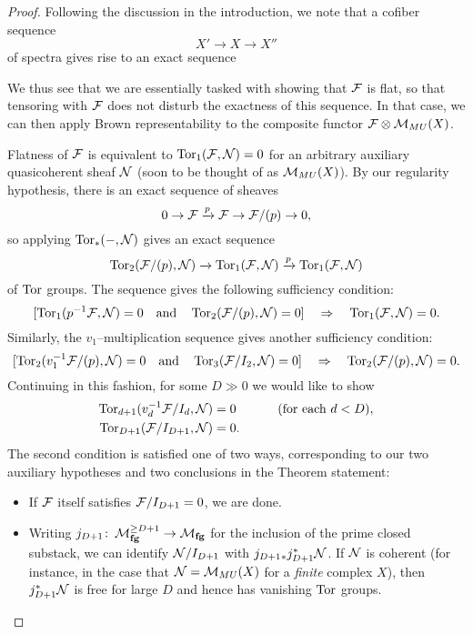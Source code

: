 \begin{proof}
Following the discussion in the introduction, we note that a cofiber sequence \[X' \to X \to X''\] of spectra gives rise to an exact sequence
\begin{center}
\end{center}
We thus see that we are essentially tasked with showing that $\mathcal{F}$ is flat, so that tensoring with $\mathcal{F}$ does not disturb the exactness of this sequence.  In that case, we can then apply Brown representability to the composite functor $\mathcal{F} \otimes \mathcal{M}_{MU}(X)$.

Flatness of $\mathcal{F}$ is equivalent to $\operatorname{Tor}_1(\mathcal{F}, \mathcal{N}) = 0$ for an arbitrary auxiliary quasicoherent sheaf $\mathcal{N}$ (soon to be thought of as $\mathcal{M}_{MU}(X)$).  By our regularity hypothesis, there is an exact sequence of sheaves \[0 \to \mathcal{F} \xrightarrow{p} \mathcal{F} \to \mathcal{F} / (p) \to 0,\] so applying $\operatorname{Tor}_*(-, \mathcal{N})$ gives an exact sequence \[\operatorname{Tor}_2(\mathcal{F} / (p), \mathcal{N}) \xrightarrow{} \operatorname{Tor}_1(\mathcal{F}, \mathcal{N}) \xrightarrow{p} \operatorname{Tor}_1(\mathcal{F}, \mathcal{N})\] of $\operatorname{Tor}$ groups.  The sequence gives the following sufficiency condition: \[[\operatorname{Tor}_1(p^{-1} \mathcal{F}, \mathcal{N}) = 0 \quad \text{and} \quad \operatorname{Tor}_2(\mathcal{F}/(p), \mathcal{N}) = 0] \quad \Rightarrow \quad \operatorname{Tor}_1(\mathcal{F}, \mathcal{N}) = 0.\]  Similarly, the $v_1$--multiplication sequence gives another sufficiency condition: \[[\operatorname{Tor}_2(v_1^{-1} \mathcal{F}/(p), \mathcal{N}) = 0 \quad \text{and} \quad \operatorname{Tor}_3(\mathcal{F}/I_2, \mathcal{N}) = 0] \quad \Rightarrow \quad \operatorname{Tor}_2(\mathcal{F}/(p), \mathcal{N}) = 0.\]  Continuing in this fashion, for some $D \gg 0$ we would like to show
\begin{align*}
\operatorname{Tor}_{d+1}(v_d^{-1} \mathcal{F}/I_d, \mathcal{N}) & = 0 & \tag{for each $d < D$}, \\
\operatorname{Tor}_{D+1}(\mathcal{F}/I_{D+1}, \mathcal{N}) & = 0.
\end{align*}
The second condition is satisfied one of two ways, corresponding to our two auxiliary hypotheses and two conclusions in the Theorem statement:
\begin{itemize}
\item If $\mathcal{F}$ itself satisfies $\mathcal{F} / I_{D+1} = 0$, we are done.
\item Writing $j_{D+1}\colon\thinspace \mathcal{M}_{\mathbf{fg}}^{\ge D+1} \to \mathcal{M}_{\mathbf{fg}}$ for the inclusion of the prime closed substack, we can identify $\mathcal{N} / I_{D+1}$ with $j_{D+1}{}_* j_{D+1}^* \mathcal{N}$.  If $\mathcal{N}$ is coherent (for instance, in the case that $\mathcal{N} = \mathcal{M}_{MU}(X)$ for a \emph{finite} complex $X$), then $j_{D+1}^* \mathcal{N}$ is free for large $D$ and hence has vanishing $\operatorname{Tor}$ groups.
\end{itemize}


\end{proof}
